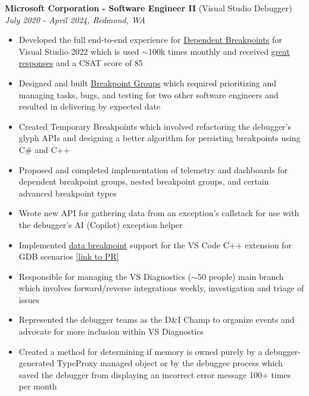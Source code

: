 \documentclass{article}
\begin{document}
\vskip 0.1in

\noindent \normalsize \textbf{Microsoft Corporation - Software Engineer II} \footnotesize (Visual Studio Debugger) \hfill \small \textit{July 2020 - April 2024, Redmond, WA}
\begin{itemize}
    \item Developed the full end-to-end experience for \href{https://learn.microsoft.com/en-us/visualstudio/debugger/using-breakpoints?view=vs-2022#BKMK_set_a_dependent_breakpoint}{Dependent Breakpoints} for Visual Studio 2022 which is used $\sim$100k times monthly and received \href{https://twitter.com/VS_Debugger/status/1437902110822047750}{great responses} and a CSAT score of 85
    \item Designed and built \href{https://devblogs.microsoft.com/visualstudio/streamlining-your-debugging-process-with-breakpoint-groups/}{Breakpoint Groups} which required prioritizing and managing tasks, bugs, and testing for two other software engineers and resulted in delivering by expected date 
    \item Created Temporary Breakpoints which involved refactoring the debugger's glyph APIs and designing a better algorithm for persisting breakpoints using C\# and C++
    \item Proposed and completed implementation of telemetry and dashboards for dependent breakpoint groups, nested breakpoint groups, and certain advanced breakpoint types
    \item Wrote new API for gathering data from an exception's callstack for use with the debugger's AI (Copilot) exception helper
    \item Implemented \href{https://devblogs.microsoft.com/cppblog/whats-new-for-c-debugging-in-visual-studio-code/#data-breakpoints}{data breakpoint} support for the VS Code C++ extension for GDB scenarios \href{https://github.com/microsoft/MIEngine/pull/1257}{[link to PR]}
    \item Responsible for managing the VS Diagnostics ($\sim$50 people) main branch which involves forward/reverse integrations weekly, investigation and triage of issues
    \item Represented the debugger teams as the D\&I Champ to organize events and advocate for more inclusion within VS Diagnostics
    \item Created a method for determining if memory is owned purely by a debugger-generated TypeProxy managed object or by the debuggee process which saved the debugger from displaying an incorrect error message 100+ times per month
\end{itemize}
\end{document}
